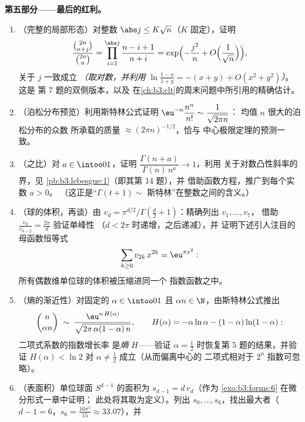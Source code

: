 \begin{problem}
\medskip
\noindent\textbf{第五部分——最后的红利。}
\begin{enumerate}[resume]
  \item （完整的局部形态）对整数 $\abs j \leq
        K\sqrt n$（$K$ 固定），证明
        \[
        \frac{\binom{2n}{n+j}}{\binom{2n}{n}} =
        \prod_{i=1}^{\abs j}\frac{n - i + 1}{n + i}
        = \exp\Bigl(-\frac{j^2}n +
        O\Bigl(\frac1{\sqrt n}\Bigr)\Bigr),
        \]
        关于 $j$ 一致成立 \emph{（取对数，并利用 $\ln
        \frac{1-x}{1+y} = -(x + y) + O(x^2 + y^2)$）}。这是
        第 7 题的双侧版本，以及
        在\cref{ch:b3:clt}的周末问题中所引用的精确估计。
  \item （泊松分布预览）利用斯特林公式证明
        $\eu^{-n}\dfrac{n^n}{n!} \sim \dfrac1{\sqrt{2\pi n}}$：
        均值 $n$ 很大的泊松分布的众数
        所承载的质量 $\approx (2\pi n)^{-1/2}$，恰与
        中心极限定理的预测一致。
  \item （之比）对 $a \in \intoo01$，证明
        $\dfrac{\Gamma(n + a)}{\Gamma(n)\,n^a} \to 1$，利用
        关于对数凸性斜率的界，见
        \cref{pb:b3:lebesgue:1}（即其第 14 题），并
        借助函数方程，推广到每个实数 $a > 0$。
        （这正是“$\Gamma(t+1) \sim$
        斯特林”在整数之间的含义。）
  \item （球的体积，再谈）由 $v_d = \pi^{d/2}/\Gamma(\frac d2
        + 1)$：精确列出 $v_1, \dots, v_7$，
        借助 $\frac{v_d}{v_{d-2}} = \frac{2\pi}d$ 验证单峰性
        （$d < 2\pi$ 时递增，之后递减），并
        证明下述引人注目的母函数恒等式
        \[
        \sum_{k\geq0}v_{2k}\,x^{2k} = \eu^{\pi x^2} :
        \]
        所有偶数维单位球的体积被压缩进同一个
        指数函数之中。
  \item （熵的渐近性）对固定的 $\alpha \in \intoo01$
        且 $\alpha n \in \N$，由斯特林公式推出
        \[
        \binom{n}{\alpha n} \;\sim\;
        \frac{\eu^{n\,H(\alpha)}}
        {\sqrt{2\pi\,\alpha(1-\alpha)\,n}},
        \qquad
        H(\alpha) = -\alpha\ln\alpha -
        (1-\alpha)\ln(1-\alpha) :
        \]
        二项式系数的指数增长率
        是\emph{熵} $H$——验证 $\alpha =
        \frac12$ 时恢复第 5 题的结果，并验证 $H(\alpha) <
        \ln2$ 对 $\alpha \neq \frac12$ 成立（从而偏离中心的
        二项式相对于 $2^n$ 指数可忽略）。
  \item （表面积）单位球面 $S^{d-1}$
        的面积为 $s_{d-1} = d\,v_d$（作为
        \cref{exo:b3:forms:6} 在微分形式一章中证明；
        此处将其取为定义）。列出
        $s_0, \dots, s_6$，找出最大者（$d - 1 =
        6$，$s_6 = \frac{16\pi^3}{15} \approx 33.07$），并

\end{enumerate}
\end{problem}
